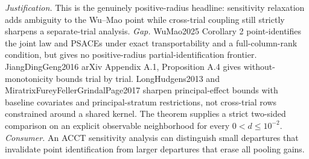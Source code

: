 \documentclass{article}
\begin{document}
\par\smallskip\noindent \textit{Justification.} This is the genuinely positive-radius headline: sensitivity relaxation adds ambiguity to the Wu--Mao point while cross-trial coupling still strictly sharpens a separate-trial analysis. \textit{Gap.} WuMao2025 Corollary 2 point-identifies the joint law and PSACEs under exact transportability and a full-column-rank condition, but gives no positive-radius partial-identification frontier. JiangDingGeng2016 arXiv Appendix A.1, Proposition A.4 gives without-monotonicity bounds trial by trial. LongHudgens2013 and MiratrixFureyFellerGrindalPage2017 sharpen principal-effect bounds with baseline covariates and principal-stratum restrictions, not cross-trial rows constrained around a shared kernel. The theorem supplies a strict two-sided comparison on an explicit observable neighborhood for every \(0<d\le10^{-2}\). \textit{Consumer.} An ACCT sensitivity analysis can distinguish small departures that invalidate point identification from larger departures that erase all pooling gains.
\end{document}
